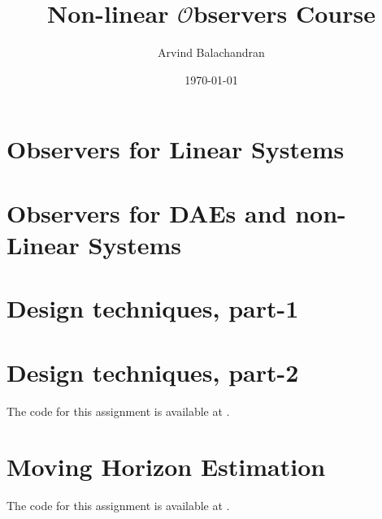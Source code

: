 \documentclass[a4paper]{book}
\title{\Large Non-linear $\mathcal{O}$bservers Course}
\author{Arvind Balachandran}
\date{\today}
\begin{document}
\maketitle
{}
\newpage
\tableofcontents
\newpage
{}

\chapter{Observers for Linear Systems}

\clearpage
 
\clearpage

\clearpage

\clearpage

\clearpage

\clearpage




\clearpage



\clearpage

\clearpage


\clearpage

\clearpage

\chapter{Observers for DAEs and non-Linear Systems}

\clearpage 

\clearpage

\clearpage

\clearpage

\clearpage

\clearpage

\clearpage


\chapter{Design techniques, part-1}


\chapter{Design techniques, part-2}
The code for this assignment is available at \href{https://github.com/arvba41/non_linear_observers/tree/main/Le4}{\faGithub\xspace}.

\clearpage

\clearpage


\chapter{Moving Horizon Estimation}
The code for this assignment is available at \href{https://github.com/arvba41/non_linear_observers/tree/main/Le5}{\faGithub\xspace}.


\end{document}
